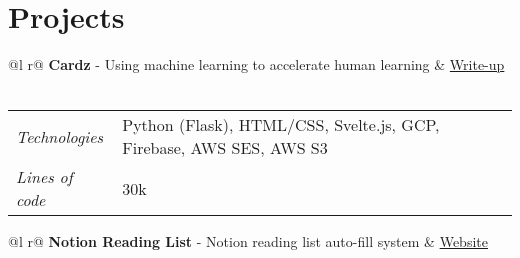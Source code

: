 \documentclass[a4paper,11pt]{article}
\begin{document}

\section{Projects}

\begin{tabularx}{\linewidth}{ @{}l r@{} }
\textbf{Cardz} - Using machine learning to accelerate human learning & \hfill \href{https://srg.id.au/posts/building-cardz}{Write-up} \\[3.75pt]
  \\

\end{tabularx}

\begin{tabularx}{\linewidth}{l X}
    \textit{Technologies} & \hfill Python (Flask), HTML/CSS, Svelte.js, GCP, Firebase, AWS SES, AWS S3 \\
    \textit{Lines of code} & \hfill 30k \\
\end{tabularx}

\begin{tabularx}{\linewidth}{ @{}l r@{} }
\textbf{Notion Reading List} - Notion reading list auto-fill system & \hfill \href{https://srg.id.au/notion-reading-list}{Website} \\[3.75pt]
  \\
\end{tabularx}
\end{document}
